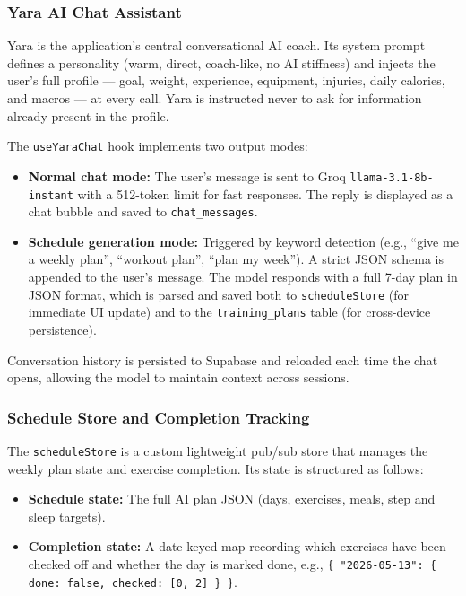 \subsubsection{Yara AI Chat Assistant}

Yara is the application's central conversational AI coach. Its system prompt
defines a personality (warm, direct, coach-like, no AI stiffness) and injects
the user's full profile — goal, weight, experience, equipment, injuries,
daily calories, and macros — at every call. Yara is instructed never to ask
for information already present in the profile.

The \texttt{useYaraChat} hook implements two output modes:

\begin{itemize}
    \item \textbf{Normal chat mode:} The user's message is sent to Groq
    \texttt{llama-3.1-8b-instant} with a 512-token limit for fast responses.
    The reply is displayed as a chat bubble and saved to
    \texttt{chat\_messages}.

    \item \textbf{Schedule generation mode:} Triggered by keyword detection
    (e.g., ``give me a weekly plan'', ``workout plan'', ``plan my week'').
    A strict JSON schema is appended to the user's message. The model
    responds with a full 7-day plan in JSON format, which is parsed and
    saved both to \texttt{scheduleStore} (for immediate UI update) and to
    the \texttt{training\_plans} table (for cross-device persistence).
\end{itemize}

Conversation history is persisted to Supabase and reloaded each time the
chat opens, allowing the model to maintain context across sessions.

\subsubsection{Schedule Store and Completion Tracking}

The \texttt{scheduleStore} is a custom lightweight pub/sub store that manages
the weekly plan state and exercise completion. Its state is structured as
follows:

\begin{itemize}
    \item \textbf{Schedule state:} The full AI plan JSON (days, exercises,
    meals, step and sleep targets).
    \item \textbf{Completion state:} A date-keyed map recording which
    exercises have been checked off and whether the day is marked done,
    e.g., \texttt{\{ "2026-05-13": \{ done: false, checked: [0, 2] \} \}}.
\end{itemize}

